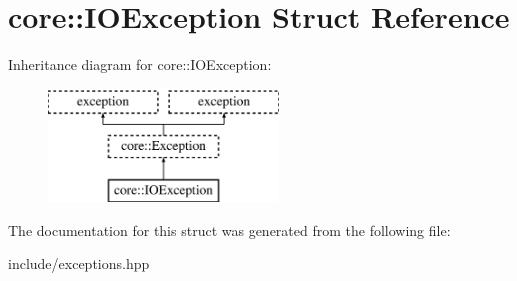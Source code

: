 \hypertarget{structcore_1_1_i_o_exception}{\section{core\-:\-:I\-O\-Exception Struct Reference}
\label{structcore_1_1_i_o_exception}
}
Inheritance diagram for core\-:\-:I\-O\-Exception\-:\begin{figure}[H]
\begin{center}
\leavevmode
\includegraphics[height=3.000000cm]{structcore_1_1_i_o_exception}
\end{center}
\end{figure}


The documentation for this struct was generated from the following file\-:\begin{DoxyCompactItemize}
\item 
include/exceptions.\-hpp\end{DoxyCompactItemize}
